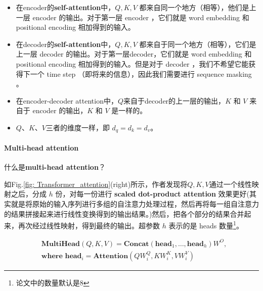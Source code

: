 \documentclass[letterpaper,10pt]{article}
\begin{document}
	\begin{itemize}
		\item {}
		
			在encoder的\textbf{self-attention}中，$Q, K, V$ 都来自同一个地方（相等），他们是上一层 encoder 的输出。对于第一层 encoder ，它们就是 word embedding 和 positional encoding 相加得到的输入。
		
		\item {}
		
			在decoder的\textbf{self-attention}中，$Q, K, V$ 都来自于同一个地方（相等），它们是上一层 decoder 的输出。对于第一层decoder，它们就是 word embedding 和 positional encoding 相加得到的输入。但是对于 decoder ，我们不希望它能获得下一个 time step （即将来的信息），因此我们需要进行 sequence masking 。

		\item {}
		
			在encoder-decoder attention中，$Q$来自于decoder的上一层的输出，$K$ 和 $V$ 来自于 encoder 的输出，$K$ 和 $V$ 是一样的。
			
		\item {}
			
			$Q$、$K$、$V$三者的维度一样，即 $d_q=d_k=d_v$。
	\end{itemize}
	
	\paragraph{Multi-head attention}
	
	什么是\textbf{multi-head attention}？
	
	如Fig.\ref{fig: Transformer_attention}(right)所示，作者发现将$Q,K,V$通过一个线性映射之后，分成 $h$ 份，对每一份进行 \textbf{scaled dot-product attention} 效果更好(其实就是将原始的输入序列进行多组的自注意力处理过程，然后再将每一组自注意力的结果拼接起来进行线性变换得到的输出结果。)然后，把各个部分的结果合并起来，再次经过线性映射，得到最终的输出。超参数 $h$ 表示的是 heads 数量\footnote{论文中的数量默认是8}。
	
	\begin{equation}
		\begin{aligned}
			& \textbf{MultiHead}(Q,K,V)=\textbf{Concat}(\textbf{head}_{1},\ldots,\textbf{head}_{h})W^{O}, \\
			& \textbf{where head}_{i} = \textbf{Attention}(QW_i^Q,KW_i^K,VW_i^V)
		\end{aligned}
		\label{eq: Multi-head attention}
	\end{equation}
	
\end{document}
